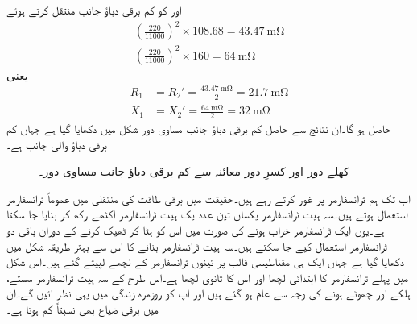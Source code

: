  اور  کو کم برقی دباؤ جانب منتقل کرتے ہوئے 
\begin{align*}
\left(\frac{220}{11000} \right)^2 \times 108.68=\SI{43.47}{\milli \ohm}\\
\left(\frac{220}{11000} \right)^2 \times 160=\SI{64}{\milli \ohm}
\end{align*}
یعنی
\begin{align*}
R_1&=R_2'=\frac{\SI{43.47}{\milli \ohm}}{2}=\SI{21.7}{\milli \ohm}\\
X_1&=X_2'=\frac{\SI{64}{\milli \ohm}}{2}=\SI{32}{\milli \ohm}
\end{align*}
حاصل ہو گا۔ان نتائج سے حاصل کم برقی دباؤ جانب مساوی دور شکل  میں دکھایا گیا ہے جہاں  کم برقی دباؤ والی جانب ہے۔
\begin{figure}
\centering
\caption{کھلے دور اور کسرِ دور معائنہ سے کم برقی دباؤ جانب  مساوی دور۔}
\label{شکل_ٹرانسفارمر_کھلے_سرے_کسر_دور_مثال}
\end{figure}
%
اب تک ہم   ٹرانسفارمر پر غور کرتے رہے ہیں۔حقیقت میں برقی طاقت کی منتقلی میں عموماً  ٹرانسفارمر استعمال ہوتے ہیں۔سہ ہیت ٹرانسفارمر یکساں تین عدد  یک ہیت  ٹرانسفارمر اکٹھے رکھ کر بنایا جا سکتا ہے۔یوں  ایک ٹرانسفارمر خراب ہونے کی صورت میں  اس کو ہٹا کر ٹھیک کرنے کے دوران  باقی دو ٹرانسفارمر استعمال  کیے جا سکتے ہیں۔سہ ہیت ٹرانسفارمر بنانے کا اس سے بہتر طریقہ شکل  میں دکھایا گیا ہے جہاں ایک ہی مقناطیسی قالب پر تینوں ٹرانسفارمر کے لچھے لپیٹے گئے ہیں۔اس شکل میں  پہلے ٹرانسفارمر کا ابتدائی لچھا اور  اس کا ثانوی لچھا ہے۔اس طرح کے سہ ہیت ٹرانسفارمر سستے، ہلکے اور چھوٹے ہونے کی وجہ سے عام ہو گئے ہیں اور آپ کو روزمرہ زندگی میں یہی نظر آئیں گے۔ان میں برقی ضیاع بھی نسبتاً  کم ہوتا ہے۔
